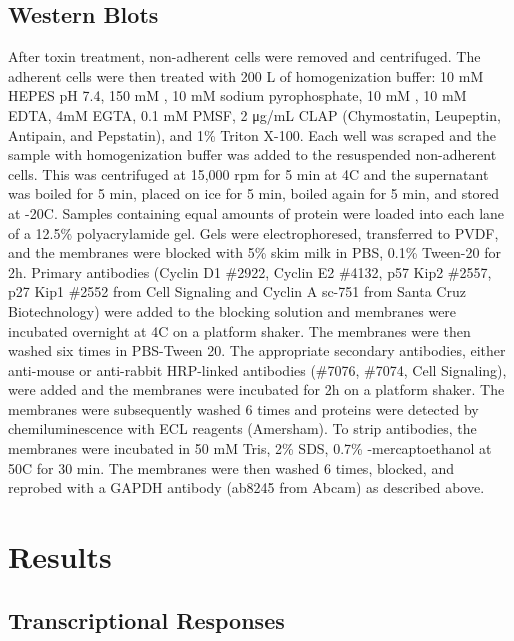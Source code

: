 \subsection{Western Blots}
After toxin treatment, non-adherent cells were removed and centrifuged. The adherent cells were then treated with 200 \textmu{}L of homogenization buffer: 10 mM HEPES pH 7.4, 150 mM , 10 mM sodium pyrophosphate, 10 mM , 10 mM EDTA, 4mM EGTA, 0.1 mM PMSF, 2 μg/mL CLAP (Chymostatin, Leupeptin, Antipain, and Pepstatin), and 1\% Triton X-100. Each well was scraped and the sample with homogenization buffer was added to the resuspended non-adherent cells. This was centrifuged at 15,000 rpm for 5 min at 4\textdegree{}C and the supernatant was boiled for 5 min, placed on ice for 5 min, boiled again for 5 min, and stored at -20\textdegree{}C. Samples containing equal amounts of protein were loaded into each lane of a 12.5\% polyacrylamide gel.  Gels were electrophoresed, transferred to PVDF, and the membranes were blocked with 5\% skim milk in PBS, 0.1\% Tween-20 for 2h. Primary antibodies (Cyclin D1 \#2922, Cyclin E2 \#4132, p57 Kip2 \#2557, p27 Kip1 \#2552 from Cell Signaling and Cyclin A sc-751 from Santa Cruz Biotechnology) were added to the blocking solution and membranes were incubated overnight at 4\textdegree{}C on a platform shaker. The membranes were then washed six times in PBS-Tween 20. The appropriate secondary antibodies, either anti-mouse or anti-rabbit HRP-linked antibodies (\#7076, \#7074, Cell Signaling), were added and the membranes were incubated for 2h on a platform shaker. The membranes were subsequently washed 6 times and proteins were detected by chemiluminescence with ECL reagents (Amersham). To strip antibodies, the membranes were incubated in 50 mM Tris, 2\% SDS, 0.7\% \textbeta{}-mercaptoethanol at 50\textdegree{}C for 30 min. The membranes were then washed 6 times, blocked, and reprobed with a GAPDH antibody (ab8245 from Abcam) as described above.


\section{Results}

\subsection{Transcriptional Responses}

